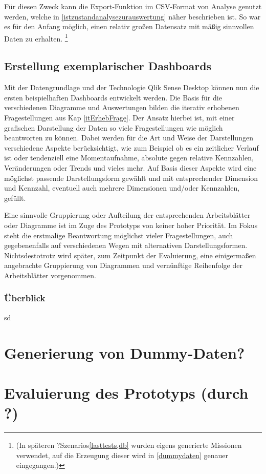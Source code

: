 Für diesen Zweck kann die Export-Funktion im CSV-Format von Analyse genutzt werden, welche in  \ref{istzustandanalysezurauswertung} näher beschrieben ist. 
So war es für den Anfang möglich, einen relativ großen Datensatz mit mäßig sinnvollen Daten zu erhalten. 
\footnote{(In späteren ?Szenarios\ref{lasttests,db} wurden eigens generierte Missionen verwendet, auf die Erzeugung dieser wird in \ref{dummydaten} genauer eingegangen.)}

\subsection{Erstellung exemplarischer Dashboards} 
Mit der Datengrundlage und der Technologie Qlik Sense Desktop können nun die ersten beispielhaften Dashboards entwickelt werden.
Die Basis für die verschiedenen Diagramme und Auswertungen bilden die iterativ erhobenen Fragestellungen aus Kap \ref{itErhebFrage}. 
Der Ansatz hierbei ist, mit einer grafischen Darstellung der Daten so viele Fragestellungen wie möglich beantworten zu können.
Dabei werden für die Art und Weise der Darstellungen verschiedene Aspekte berücksichtigt, wie zum Beispiel ob es ein zeitlicher Verlauf ist oder tendenziell eine Momentaufnahme, absolute gegen relative Kennzahlen, Veränderungen oder Trends und vieles mehr.
Auf Basis dieser Aspekte wird eine möglichst passende Darstellungsform gewählt und mit entsprechender Dimension und Kennzahl, eventuell auch mehrere Dimensionen und/oder Kennzahlen, gefüllt.

Eine sinnvolle Gruppierung oder Aufteilung der entsprechenden Arbeitsblätter oder Diagramme ist im Zuge des Prototyps von keiner hoher Priorität. 
Im Fokus steht die erstmalige Beantwortung möglichst vieler Fragestellungen, auch gegebenenfalls auf verschiedenen Wegen mit alternativen Darstellungsformen.
Nichtsdestotrotz wird später, zum Zeitpunkt der Evaluierung, eine einigermaßen angebrachte Gruppierung von Diagrammen und vernünftige Reihenfolge der Arbeitsblätter vorgenommen.

\subsubsection{Überblick}
sd

\section{Generierung von Dummy-Daten?}

\section{Evaluierung  des Prototyps (durch ?)}
